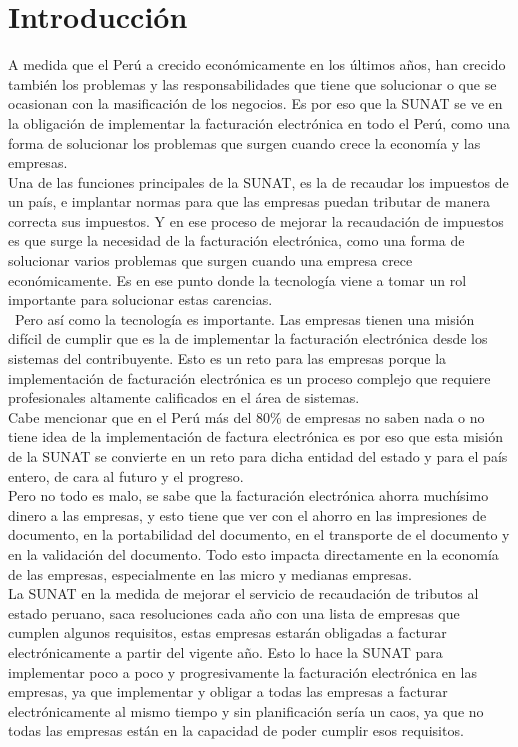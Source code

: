 \chapter*{Introducción}A medida que el Perú a crecido económicamente en los últimos años, han crecido también los problemas y las responsabilidades que tiene que solucionar o que se ocasionan con la masificación de los negocios. Es por eso que la SUNAT se ve en la obligación de implementar la facturación electrónica en todo el Perú, como una forma de solucionar los problemas que surgen cuando crece la economía y las empresas.
\\
Una de las funciones principales de la SUNAT, es la de recaudar los impuestos de un país, e implantar normas para que las empresas puedan tributar de manera correcta sus impuestos. Y en ese proceso de mejorar la recaudación de impuestos es que surge la necesidad de la facturación electrónica, como una forma de solucionar varios problemas que surgen cuando una empresa crece económicamente. Es en ese punto donde la tecnología viene a tomar un rol importante para solucionar estas carencias.
\\\
Pero así como la tecnología es importante. Las empresas tienen una misión difícil de cumplir que es la de implementar la facturación electrónica desde los sistemas del contribuyente. Esto es un reto para las empresas porque la implementación de facturación electrónica es un proceso complejo que requiere profesionales altamente calificados en el área de sistemas. 
\\
Cabe mencionar que en el Perú más del 80\% de empresas no saben nada o no tiene idea de la implementación de factura electrónica es por eso que esta misión de la SUNAT se convierte en un reto para dicha entidad del estado y para el país entero, de cara al futuro y el progreso. 
\\
Pero no todo es malo, se sabe que la facturación electrónica ahorra muchísimo dinero a las empresas, y esto tiene que ver con el ahorro en las impresiones de documento, en la portabilidad del documento, en el transporte de el documento y en la validación del documento. Todo esto impacta directamente en la economía de las empresas, especialmente en las micro y medianas empresas. \\

La SUNAT en la medida de mejorar el servicio de recaudación de tributos al estado peruano, saca resoluciones cada año con una lista de empresas que cumplen algunos requisitos, estas empresas estarán obligadas a facturar electrónicamente a partir del vigente año. Esto lo hace la SUNAT para implementar poco a poco y progresivamente la facturación electrónica en las empresas, ya que implementar y obligar a todas las empresas a facturar electrónicamente al mismo tiempo y sin planificación sería un caos, ya que no todas las empresas están en la capacidad de poder cumplir esos requisitos.\\

